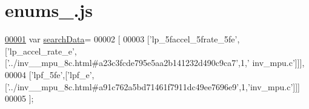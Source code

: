 \hypertarget{enums__3_8js_source}{}\section{enums\+\_.\+js}
\label{enums__3_8js_source}

\begin{DoxyCode}
\hypertarget{enums__3_8js_source.tex_l00001}{}\hyperlink{enums__3_8js_ad01a7523f103d6242ef9b0451861231e}{00001} var \hyperlink{enums__3_8js_ad01a7523f103d6242ef9b0451861231e}{searchData}=
00002 [
00003   [\textcolor{stringliteral}{'lp\_5faccel\_5frate\_5fe'},[\textcolor{stringliteral}{'lp\_accel\_rate\_e'},[\textcolor{stringliteral}{'../inv\_\_mpu\_8c.html#a23c3fcde795e5aa2b141232d490c9ca7'},1,\textcolor{stringliteral}{'
      inv\_mpu.c'}]]],
00004   [\textcolor{stringliteral}{'lpf\_5fe'},[\textcolor{stringliteral}{'lpf\_e'},[\textcolor{stringliteral}{'../inv\_\_mpu\_8c.html#a91c762a5bd71461f7911dc49ee7696e9'},1,\textcolor{stringliteral}{'inv\_mpu.c'}]]]
00005 ];
\end{DoxyCode}

